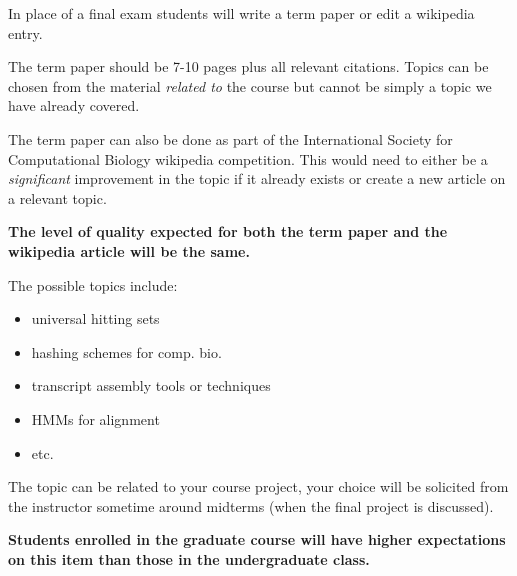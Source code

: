 \documentclass[12pt]{scrartcl}
\begin{document}
In place of a final exam students will write a term paper or edit a wikipedia entry. 

The term paper should be 7-10 pages plus all relevant citations.
Topics can be chosen from the material \textit{related to} the course but cannot be simply a topic we have already covered. 

The term paper can also be done as part of the International Society for Computational Biology wikipedia competition.
This would need to either be a \textit{significant} improvement in the topic if it already exists or create a new article on a relevant topic. 

\textbf{The level of quality expected for both the term paper and the wikipedia article will be the same.}

The possible topics include: 
\begin{itemize}
\item universal hitting sets
\item hashing schemes for comp. bio. 
\item transcript assembly tools or techniques
\item HMMs for alignment
\item etc. 
\end{itemize}
The topic can be related to your course project, your choice will be solicited from the instructor sometime around midterms (when the final project is discussed). 


\textbf{Students enrolled in the graduate course will have higher expectations on this item than those in the undergraduate class.}

%
\end{document}
